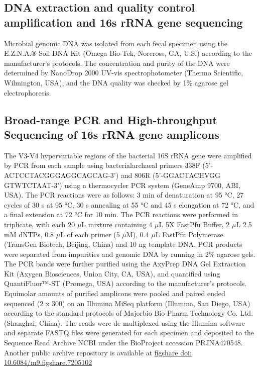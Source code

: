 \documentclass[fleqn,10pt, lineno]{wlpeerj} %
\begin{document}
  \subsection*{DNA extraction and quality control amplification and 16s rRNA gene sequencing}
  Microbial genomic DNA was isolated from each fecal specimen using the E.Z.N.A.® Soil DNA Kit (Omega Bio-Tek, Norcross, GA, U.S.) according to the manufacturer’s protocols. The concentration and purity of the DNA were determined by NanoDrop 2000 UV-vis spectrophotometer (Thermo Scientific, Wilmington, USA), and the DNA quality was checked by 1\% agarose gel electrophoresis.

  \subsection*{Broad-range PCR and High-throughput Sequencing of 16s rRNA gene amplicons}
  The V3-V4 hypervariable regions of the bacterial 16S rRNA gene were amplified by PCR from each sample using bacterial\/archaeal primers 338F (5’-ACTCCTACGGGAGGCAGCAG-3’) and 806R (5’-GGACTACHVGG GTWTCTAAT-3’) using a thermocycler PCR system (GeneAmp 9700, ABI, USA). The PCR reactions were as follows: 3 min of denaturation at 95 °C, 27 cycles of 30 s at 95 °C, 30 s annealing at 55 °C and 45 s elongation at 72 °C, and a final extension at 72 °C for 10 min. The PCR reactions were performed in triplicate, with each 20 $\mu$L mixture containing 4 $\mu$L 5X FastPfu Buffer, 2 $\mu$L 2.5 mM dNTPs, 0.8 $\mu$L of each primer (5 $\mu$M), 0.4 $\mu$L FastPfu Polymerase (TransGen Biotech, Beijing, China) and 10 ng template DNA.  PCR products were separated from impurities and genomic DNA by running in 2\% agarose gels.  The PCR bands were further purified using the AxyPrep DNA Gel Extraction Kit (Axygen Biosciences, Union City, CA, USA), and quantified using QuantiFluor™-ST (Promega, USA) according to the manufacturer’s protocols.
  Equimolar amounts of purified amplicons were pooled and paired ended sequenced (2 x 300) on an Illumina MiSeq platform (Illumina, San Diego, USA) according to the standard protocols of Majorbio Bio-Pharm Technology Co. Ltd. (Shanghai, China). The reads were de-multiplexed using the Illumina software and separate FASTQ files were generated for each specimen and deposited to the Sequence Read Archive NCBI under the BioProject accession PRJNA470548. Another public archive repository is available at \href{https://figshare.com/articles/Untitled_Item192_samples_for_publishing_Longitudinal_gut_microbiota_patterns_in_preterm_infants_with_necrotizing_enterocolitis_or_late-onset_sepsis_an_observational_prospective_study_/7205102}{figshare doi: 10.6084/m9.figshare.7205102}
\end{document}
